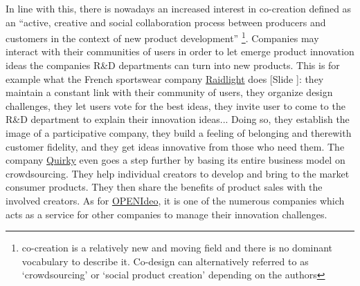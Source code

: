 \documentclass{article}
\newcounter{slide}
\begin{document}
In line with this, there is nowadays an increased interest in co-creation defined as an ``active, creative and social collaboration process between producers and customers in the context of new product development'' \cite{pillerSocialMediaSocial2011} \footnote{co-creation is a relatively new and moving field and there is no dominant vocabulary to describe it. Co-design can alternatively referred to as `crowdsourcing' or `social product creation' depending on the authors}. Companies may interact with their communities of users in order to let emerge product innovation ideas the companies R\&D departments can turn into new products. This is for example what the French sportswear company \href{https://team.fr.raidlight.com/categories/atelier-de-conception-ouvert-a-tous.369/}{Raidlight} does {\color{blue}[Slide ]}: they maintain a constant link with their community of users, they organize design challenges, they let users vote for the best ideas, they invite user to come to the R\&D department to explain their innovation ideas... Doing so, they establish the image of a participative company, they build a feeling of belonging and therewith customer fidelity, and they get ideas innovative from those who need them. The company \href{https://quirky.com}{Quirky} even goes a step further by basing its entire business model on crowdsourcing. They help individual creators to develop and bring to the market consumer products. They then share the benefits of product sales with the involved creators. As for \href{https://www.openideo.com/}{OPENIdeo}, it is one of the numerous companies which acts as a service for other companies to manage their innovation challenges. 
\end{document}
